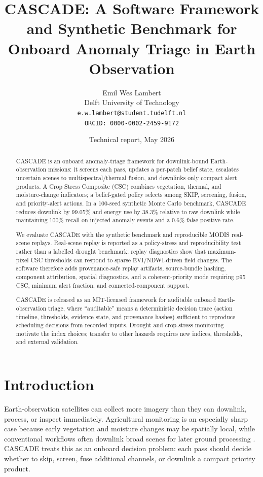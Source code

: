 \documentclass[11pt]{article}
\title{CASCADE: A Software Framework and Synthetic Benchmark for Onboard Anomaly Triage in Earth Observation}
\author{Emil Wes Lambert\\Delft University of Technology\\\texttt{e.w.lambert@student.tudelft.nl}\\\texttt{ORCID: 0000-0002-2459-9172}}
\date{Technical report, May 2026}
\begin{document}
\pagestyle{fancy}
\fancyhf{}
\fancyfoot[C]{\thepage}
\setlength{\headheight}{14pt}
\renewcommand{\headrulewidth}{0.3pt}
\maketitle

\begin{abstract}
CASCADE is an onboard anomaly-triage framework for downlink-bound Earth-observation missions: it screens each pass, updates a per-patch belief state, escalates uncertain scenes to multispectral/thermal fusion, and downlinks only compact alert products. A Crop Stress Composite (CSC) combines vegetation, thermal, and moisture-change indicators; a belief-gated policy selects among SKIP, screening, fusion, and priority-alert actions. In a 100-seed synthetic Monte Carlo benchmark, CASCADE reduces downlink by 99.05\% and energy use by 38.3\% relative to raw downlink while maintaining 100\% recall on injected anomaly events and a 0.6\% false-positive rate.

We evaluate CASCADE with the synthetic benchmark and reproducible MODIS real-scene replays. Real-scene replay is reported as a policy-stress and reproducibility test rather than a labelled drought benchmark: replay diagnostics show that maximum-pixel CSC thresholds can respond to sparse EVI/NDWI-driven field changes. The software therefore adds provenance-safe replay artifacts, source-bundle hashing, component attribution, spatial diagnostics, and a coherent-priority mode requiring p95 CSC, minimum alert fraction, and connected-component support.

CASCADE is released as an MIT-licensed framework for auditable onboard Earth-observation triage, where ``auditable'' means a deterministic decision trace (action timeline, thresholds, evidence state, and provenance hashes) sufficient to reproduce scheduling decisions from recorded inputs. Drought and crop-stress monitoring motivate the index choices; transfer to other hazards requires new indices, thresholds, and external validation.
\end{abstract}

\section{Introduction}

Earth-observation satellites can collect more imagery than they can downlink, process, or inspect immediately. Agricultural monitoring is an especially sharp case because early vegetation and moisture changes may be spatially local, while conventional workflows often downlink broad scenes for later ground processing \cite{mishra-singh-2010,nasa-challenge-brief}. CASCADE treats this as an onboard decision problem: each pass should decide whether to skip, screen, fuse additional channels, or downlink a compact priority product.
\end{document}
